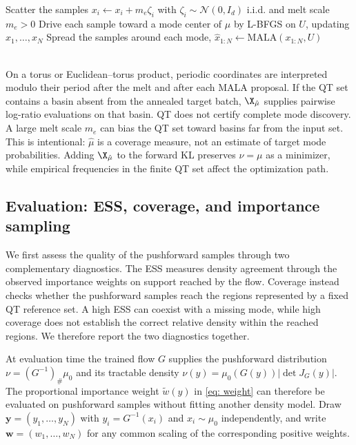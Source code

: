 \documentclass{article}
\begin{document}
\begin{algorithm}[htb]
\caption{Quench and temper (QT): wide-coverage construction}
\label{alg: QT}
Scatter the samples $x_i \gets x_i + m_e\zeta_i$ with $\zeta_i \sim \mathcal N(0, I_d)$ i.i.d. and melt scale $m_e > 0$\;
Drive each sample toward a mode center of $\mu$ by L-BFGS on $U$, updating $x_1,\dots,x_N$\;
Spread the samples around each mode, $\hat x_{1:N} \gets \mathrm{MALA}(x_{1:N}, U)$\;
\end{algorithm}
\mbox{}\\
On a torus or Euclidean--torus product, periodic coordinates are interpreted modulo their period after the melt and after each MALA proposal. If the QT set contains a basin absent from the annealed target batch, $\X_{\hat\mu}$ supplies pairwise log-ratio evaluations on that basin. QT does not certify complete mode discovery. A large melt scale $m_e$ can bias the QT set toward basins far from the input set. This is intentional: $\hat\mu$ is a coverage measure, not an estimate of target mode probabilities. Adding $\X_{\hat\mu}$ to the forward KL preserves $\nu=\mu$ as a minimizer, while empirical frequencies in the finite QT set affect the optimization path.

\subsection{Evaluation: ESS, coverage, and importance sampling}
\label{subsec: eval}

We first assess the quality of the pushforward samples through two complementary diagnostics. The ESS measures density agreement through the observed importance weights on support reached by the flow. Coverage instead checks whether the pushforward samples reach the regions represented by a fixed QT reference set. A high ESS can coexist with a missing mode, while high coverage does not establish the correct relative density within the reached regions. We therefore report the two diagnostics together.

At evaluation time the trained flow $G$ supplies the pushforward distribution $\nu=(G^{-1})_{\#}\mu_0$ and its tractable density $\nu(y)=\mu_0(G(y))|\det J_G(y)|$. The proportional importance weight $\widetilde w(y)$ in \eqref{eq: weight} can therefore be evaluated on pushforward samples without fitting another density model. Draw $\mathbf y=(y_1,\dots,y_N)$ with $y_i=G^{-1}(x_i)$ and $x_i\sim\mu_0$ independently, and write $\mathbf w=(w_1,\dots,w_N)$ for any common scaling of the corresponding positive weights.
\end{document}
